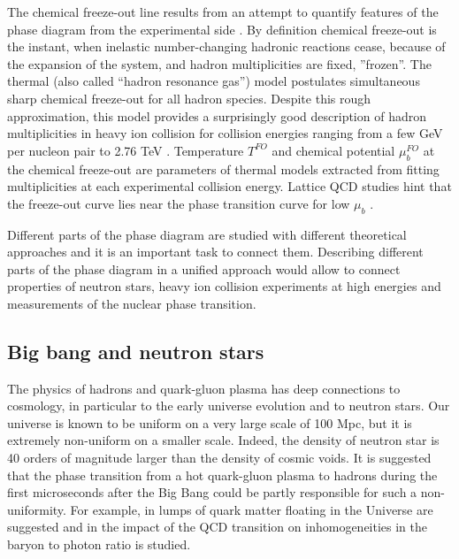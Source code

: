 The chemical freeze-out line results from an attempt to quantify features of the
phase diagram from the experimental side \cite{Andronic:2005yp}. By definition
chemical freeze-out is the instant, when inelastic number-changing hadronic
reactions cease, because of the expansion of the system, and hadron multiplicities
are fixed, ''frozen''. The thermal (also called ``hadron resonance gas'') model
postulates simultaneous sharp chemical freeze-out for all hadron species. Despite
this rough approximation, this model provides a surprisingly
good description of hadron multiplicities in heavy ion collision for collision
energies ranging from a few GeV per nucleon pair to 2.76 TeV
\cite{Cleymans:1999st,Andronic:2005yp,Stachel:2013zma}.  Temperature $T^{FO}$
and chemical potential $\mu_b^{FO}$ at the chemical freeze-out are parameters of
thermal models extracted from fitting multiplicities at each
experimental collision energy. Lattice QCD studies hint that the freeze-out curve
lies near the phase transition curve for low $\mu_b$ \cite{Kaczmarek:2011zz}.

Different parts of the phase diagram are studied with different theoretical
approaches and it is an important task to connect them. Describing different parts of
the phase diagram in a unified approach would allow
to connect properties of neutron stars, heavy ion collision experiments at
high energies and measurements of the nuclear phase transition.

\subsection{Big bang and neutron stars}

The physics of hadrons and quark-gluon plasma has deep connections to cosmology, in
particular to the early universe evolution and to neutron stars. Our universe is
known to be uniform on a very large scale of 100 Mpc, but it is extremely
non-uniform on a smaller scale. Indeed, the density of neutron star is 40
orders of magnitude larger than the density of cosmic voids. It is suggested that
the phase transition from a hot quark-gluon plasma to hadrons during the first
microseconds after the Big Bang could be partly responsible for such a non-uniformity.
For example, in \cite{Witten:1984rs} lumps of quark matter floating in
the Universe are suggested and in \cite{Kapusta:2000fe} the impact of the QCD
transition on inhomogeneities in the baryon to photon ratio is studied.

